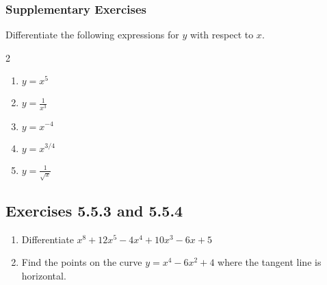 \subsubsection{Supplementary Exercises}
Differentiate the following expressions for $y$ with respect to $x$.  
\columnsep =30pt
\begin {multicols}{2}



\begin{enumerate}
	\item $y =x^{5}$ 
	
	\item $y =\frac{1}{x^{3}}$ 
	
	\item $y =x^{ -4}$ 
	
	\item $y =x^{3/4}$ 
	
	\item $y =\frac{1}{\sqrt{x}}$ \end{enumerate}



\end {multicols}

\subsection{Exercises 5.5.3 and 5.5.4}
\begin{enumerate}
	\item Differentiate $x^{8} +12 x^{5} -4 x^{4} +10 x^{3} -6 x +5$ 
	
	\item Find the points on the curve $y =x^{4} -6 x^{2} +4$ where the tangent line is horizontal. \end{enumerate}


